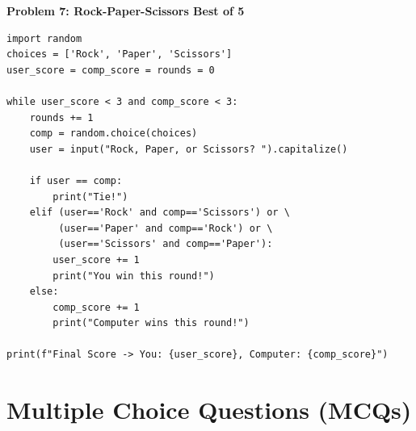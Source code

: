 \begin{solutionbox}
\vspace{10pt}
\noindent\textbf{Problem 7: Rock-Paper-Scissors Best of 5}
\begin{lstlisting}[language=Python3]
import random
choices = ['Rock', 'Paper', 'Scissors']
user_score = comp_score = rounds = 0

while user_score < 3 and comp_score < 3:
    rounds += 1
    comp = random.choice(choices)
    user = input("Rock, Paper, or Scissors? ").capitalize()
    
    if user == comp:
        print("Tie!")
    elif (user=='Rock' and comp=='Scissors') or \
         (user=='Paper' and comp=='Rock') or \
         (user=='Scissors' and comp=='Paper'):
        user_score += 1
        print("You win this round!")
    else:
        comp_score += 1
        print("Computer wins this round!")

print(f"Final Score -> You: {user_score}, Computer: {comp_score}")
\end{lstlisting}
\end{solutionbox}

\section{Multiple Choice Questions (MCQs)}

